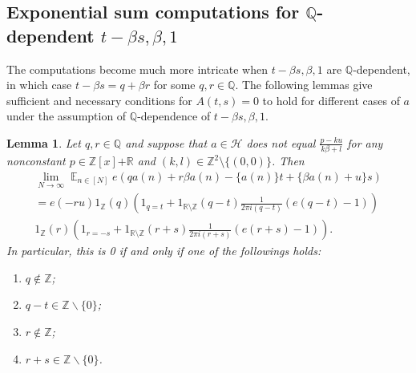 \documentclass[11pt]{amsart}
\newtheorem{lemma}{Lemma}[section]
\theoremstyle{definition}
\DeclareMathOperator*{\E}{\mathbb{E}}
\newcommand{\Q}{{\mathbb Q}}
\newcommand{\R}{{\mathbb R}}
\newcommand{\Z}{{\mathbb Z}}
\newcommand{\CH}{{\mathcal H}}
\newcommand{\1}{{\mathbf{1}}}
\newcommand{\brac}[1]{\mathopen{}\left( #1 \mathclose{}\right)}
\begin{document}
\subsection{Exponential sum computations for $\Q$-dependent $t-\beta s, \beta, 1$}\label{SS: Q-dependent}
The computations become much more intricate when $ t-\beta s, \beta, 1$ are $\Q$-dependent, in which case $t-\beta s = q+\beta r$ for some $q,r\in\Q$.
The following lemmas give sufficient and necessary conditions for $A(t,s) = 0$ to hold for different cases of $a$ under the assumption of $\Q$-dependence of $ t-\beta s, \beta, 1$.
\begin{lemma}\label{L: a, beta a eq}
Let $q, r\in\Q$ and suppose that $a\in\CH$ does not equal $\frac{p - ku}{k\beta + l}$ for any nonconstant $p\in\Z[x]{+\R}$ and $(k, l)\in\Z^2\setminus{\{(0,0)\}}$. Then
\begin{multline*}
    \lim_{N\to\infty}\E_{n\in[N]} e(q a(n)+r \beta a(n)-\{ a(n)\}t +\{\beta a(n)+u\}s)\\
=    e(-ru)1_\Z(q) \brac{1_{q=t} + 1_{\R\setminus\Z}(q-t)\frac{1}{2\pi i(q-t)}(e(q-t)-1)}\\
1_\Z(r)\brac{1_{r=-s} + 1_{\R\setminus\Z}(r+s)\frac{1}{2\pi i(r+s)}(e(r+s)-1)}.
\end{multline*}
 In particular, this is 0 if and only if one of the followings holds:
    \begin{enumerate}
    \item $q\notin \Z$;
    \item $q-t\in\mathbb{Z}\backslash\{0\}$;
    \item $r\notin \mathbb{Z}$;
    \item $r+s\in\mathbb{Z}\backslash\{0\}$.
\end{enumerate}
\end{lemma}
\end{document}

